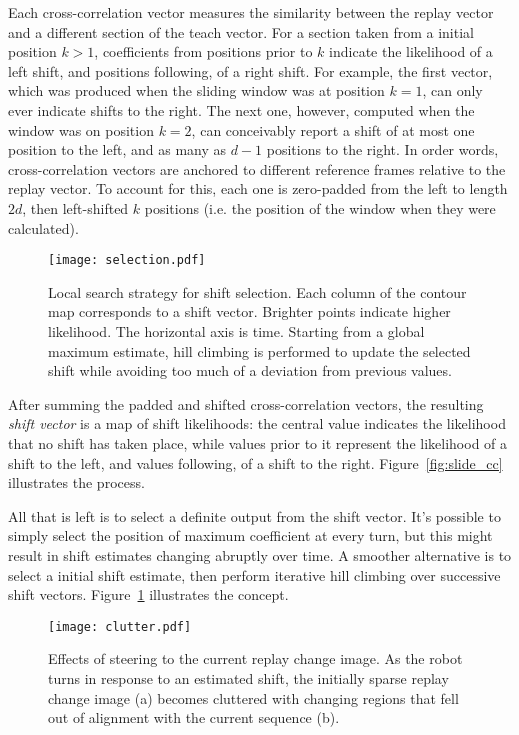 \documentclass[twocolumn, 9pt,fleqn]{jsproceedings}
\begin{document}
Each cross-correlation vector measures the similarity between the replay vector and a different section of the teach vector. For a section taken from a initial position $k > 1$, coefficients from positions prior to $k$ indicate the likelihood of a left shift, and positions following, of a right shift. For example, the first vector, which was produced when the sliding window was at position $k = 1$, can only ever indicate shifts to the right. The next one, however, computed when the window was on position $k = 2$, can conceivably report a shift of at most one position to the left, and as many as $d-1$ positions to the right. In order words, cross-correlation vectors are anchored to different reference frames relative to the replay vector. To account for this, each one is zero-padded from the left to length $2d$, then left-shifted $k$ positions (i.e. the position of the window when they were calculated).

\begin{figure}[h!]
\texttt{[image: selection.pdf]}
\caption{Local search strategy for shift selection. Each column of the contour map corresponds to a shift vector. Brighter points indicate higher likelihood. The horizontal axis is time. Starting from a global maximum estimate, hill climbing is performed to update the selected shift while avoiding too much of a deviation from previous values.}
\label{fig:selection}
\end{figure}

After summing the padded and shifted cross-correlation vectors, the resulting \textit{shift vector} is a map of shift likelihoods: the central value indicates the likelihood that no shift has taken place, while values prior to it represent the likelihood of a shift to the left, and values following, of a shift to the right. Figure~\ref{fig:slide_cc} illustrates the process.

All that is left is to select a definite output from the shift vector. It's possible to simply select the position of maximum coefficient at every turn, but this might result in shift estimates changing abruptly over time. A smoother alternative is to select a initial shift estimate, then perform iterative hill climbing over successive shift vectors. Figure~\ref{fig:selection} illustrates the concept.

\begin{figure}[h!]
\centering
\texttt{[image: clutter.pdf]}
\caption{Effects of steering to the current replay change image. As the robot turns in response to an estimated shift, the initially sparse replay change image (a) becomes cluttered with changing regions that fell out of alignment with the current sequence (b).}
\label{fig:clutter}
\end{figure}
\end{document}
